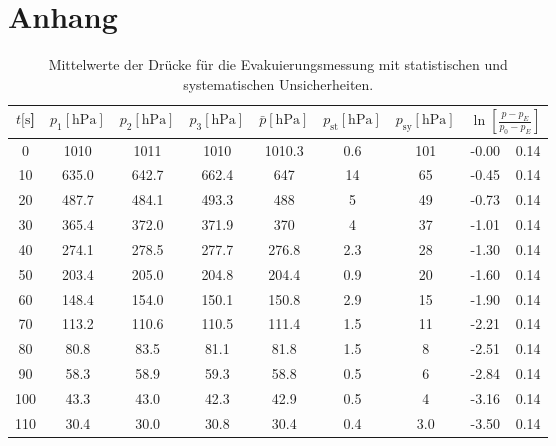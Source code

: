 \section*{Anhang}
\begin{table}[H]
    \centering
      \caption{Mittelwerte der Drücke für die Evakuierungsmessung mit statistischen und systematischen Unsicherheiten.}
      \label{tab:Dreh_Evak}
      \tiny{
      \begin{tabular}{
        S[table-format=3.0] 
        S[table-format=4.2]
        S[table-format=4.2]
        S[table-format=4.2]
        S[table-format=4.2] 
        S[table-format=1.3] 
        S[table-format=3.2] 
        S[table-format=2.2] @{${}\pm{}$} S[table-format=1.2]}
        \toprule
        {$t [\si{\second}$]} &
        {$p_1 [\si{\hecto\pascal}]$} &
        {$p_2 [\si{\hecto\pascal}]$} &
        {$p_3 [\si{\hecto\pascal}]$} & 
        {$\bar{p} [\si{\hecto\pascal}]$} & 
        {$p_\text{st} [\si{\hecto\pascal}]$} & 
        {$p_\text{sy} [\si{\hecto\pascal}]$} & 
         \\            
           &1010  & 1011  &  1010 & 1010.3 & 0.6     & 101   & -0.00 & 0.14\\  
        10  &635.0 & 642.7 &  662.4& 647    & 14      & 65    & -0.45 & 0.14\\  
        20  &487.7 & 484.1 &  493.3& 488    & 5       & 49    & -0.73 & 0.14\\  
        30  &365.4 & 372.0 &  371.9& 370    & 4       & 37    & -1.01 & 0.14\\  
        40  &274.1 & 278.5 &  277.7& 276.8  & 2.3     & 28    & -1.30 & 0.14\\  
        50  &203.4 & 205.0 &  204.8& 204.4  & 0.9     & 20    & -1.60 & 0.14\\  
        60  &148.4 & 154.0 &  150.1& 150.8  & 2.9     & 15    & -1.90 & 0.14\\  
        70  &113.2 & 110.6 &  110.5& 111.4  & 1.5     & 11    & -2.21 & 0.14\\  
        80  &80.8  & 83.5  &  81.1 & 81.8   & 1.5     & 8     & -2.51 & 0.14\\  
        90  &58.3  & 58.9  &  59.3 & 58.8   & 0.5     & 6     & -2.84 & 0.14\\  
        100 &43.3  & 43.0  &  42.3 & 42.9   & 0.5     & 4     & -3.16 & 0.14\\  
        110 &30.4  & 30.0  &  30.8 & 30.4   & 0.4     & 3.0   & -3.50 & 0.14\\  

\end{tabular}}
\end{table}
